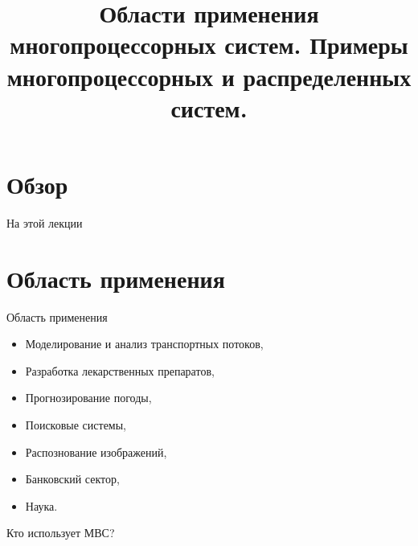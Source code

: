 

\title{Области применения многопроцессорных систем. Примеры многопроцессорных и распределенных систем.}



\begin{frame}
\titlepage
\end{frame}

\section*{Обзор}

\begin{frame}{На этой лекции}
\tableofcontents
\end{frame}

\section{Область применения}

\begin{frame}{Область применения}
\begin{itemize}
    \item Моделирование и анализ транспортных потоков,
    \item Разработка лекарственных препаратов,
    \item Прогнозирование погоды,
    \item Поисковые системы,
    \item Распознование изображений,
    \item Банковский сектор,
    \item Наука.
\end{itemize}
\end{frame}

\begin{frame}{Кто использует МВС?}
\begin{figure}[htpb]
\pause
\begin{minipage}[htpb]{0.3\textwidth}
\end{minipage}
\pause
\hspace*{0.05\textwidth}
\begin{minipage}[htpb]{0.25\textwidth}
\end{minipage}
\pause
\vfill
\begin{minipage}[htpb]{0.3\textwidth}
\end{minipage}
\pause
\begin{minipage}[htpb]{0.3\textwidth}
\end{minipage}
\pause
\begin{minipage}[htpb]{0.3\textwidth}
\end{minipage}
\end{figure}
\end{frame}

